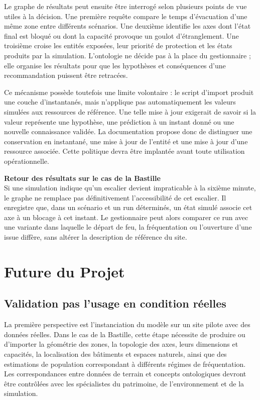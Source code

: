 \documentclass{article}
\begin{document}
Le graphe de résultats peut ensuite être interrogé selon plusieurs points de vue utiles à la décision. Une première requête compare le temps d'évacuation d'une même zone entre différents scénarios. Une deuxième identifie les axes dont l'état final est bloqué ou dont la capacité provoque un goulot d'étranglement. Une troisième croise les entités exposées, leur priorité de protection et les états produits par la simulation. L'ontologie ne décide pas à la place du gestionnaire ; elle organise les résultats pour que les hypothèses et conséquences d'une recommandation puissent être retracées.

Ce mécanisme possède toutefois une limite volontaire : le script d'import produit une couche d'instantanés, mais n'applique pas automatiquement les valeurs simulées aux ressources de référence. Une telle mise à jour exigerait de savoir si la valeur représente une hypothèse, une prédiction à un instant donné ou une nouvelle connaissance validée. La documentation propose donc de distinguer une conservation en instantané, une mise à jour de l'entité et une mise à jour d'une ressource associée. Cette politique devra être implantée avant toute utilisation opérationnelle.

\begin{filrouge}
\textbf{Retour des résultats sur le cas de la Bastille} \\
Si une simulation indique qu'un escalier devient impraticable à la sixième minute, le graphe ne remplace pas définitivement l'accessibilité de cet escalier. Il enregistre que, dans un scénario et un run déterminés, un état simulé associe cet axe à un blocage à cet instant. Le gestionnaire peut alors comparer ce run avec une variante dans laquelle le départ de feu, la fréquentation ou l'ouverture d'une issue diffère, sans altérer la description de référence du site.
\end{filrouge}

\clearpage
\section{Future du Projet}
\subsection{Validation pas l'usage en condition réelles}

La première perspective est l'instanciation du modèle sur un site pilote avec des données réelles. Dans le cas de la Bastille, cette étape nécessite de produire ou d'importer la géométrie des zones, la topologie des axes, leurs dimensions et capacités, la localisation des bâtiments et espaces naturels, ainsi que des estimations de population correspondant à différents régimes de fréquentation. Les correspondances entre données de terrain et concepts ontologiques devront être contrôlées avec les spécialistes du patrimoine, de l'environnement et de la simulation.
\end{document}
